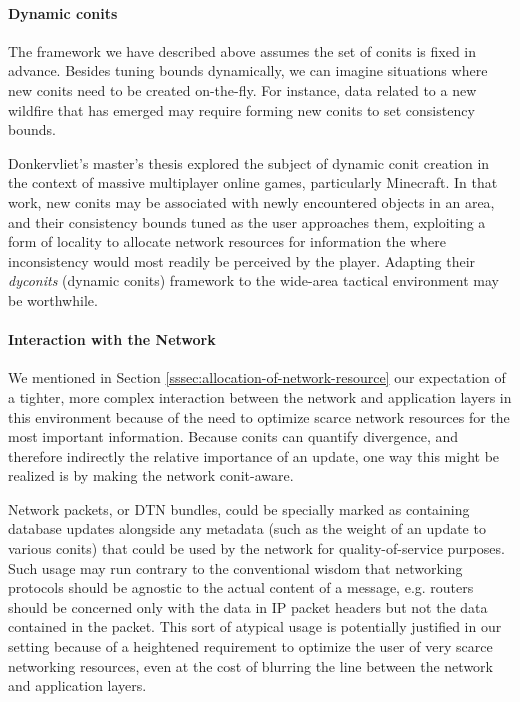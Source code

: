\documentclass[]             %
{NASA}                       %
\theoremstyle{definition}
\begin{document}
\paragraph{Dynamic conits}
The framework we have described above assumes the set of conits is
fixed in advance. Besides tuning bounds dynamically, we can imagine
situations where new conits need to be created on-the-fly. For
instance, data related to a new wildfire that has emerged may require
forming new conits to set consistency bounds.

Donkervliet's master's thesis \cite{dyconits} explored the subject of
dynamic conit creation in the context of massive multiplayer online
games, particularly Minecraft. In that work, new conits may be
associated with newly encountered objects in an area, and their
consistency bounds tuned as the user approaches them, exploiting a
form of locality to allocate network resources for information the
where inconsistency would most readily be perceived by the
player. Adapting their \emph{dyconits} (dynamic conits) framework to
the wide-area tactical environment may be worthwhile.

\paragraph{Interaction with the Network}
We mentioned in Section \ref{sssec:allocation-of-network-resource} our
expectation of a tighter, more complex interaction between the network
and application layers in this environment because of the need to
optimize scarce network resources for the most important
information. Because conits can quantify divergence, and therefore
indirectly the relative importance of an update, one way this might be
realized is by making the network conit-aware.

Network packets, or DTN bundles, could be specially marked as
containing database updates alongside any metadata (such as the weight
of an update to various conits) that could be used by the network for
quality-of-service purposes. Such usage may run contrary to the
conventional wisdom that networking protocols should be agnostic to
the actual content of a message, e.g. routers should be concerned only
with the data in IP packet headers but not the data contained in the
packet. This sort of atypical usage is potentially justified in our
setting because of a heightened requirement to optimize the user of
very scarce networking resources, even at the cost of blurring the
line between the network and application layers.
\end{document}
